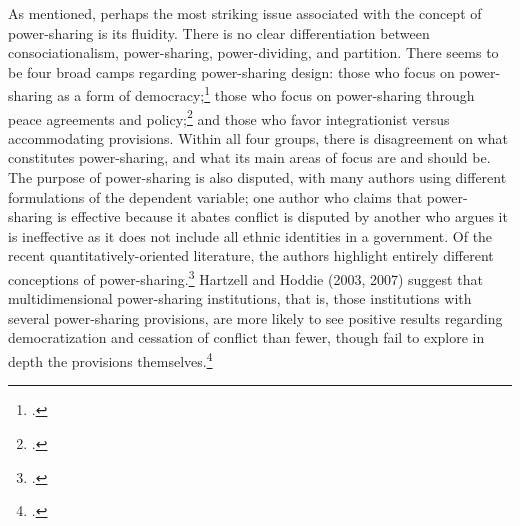 \documentclass[12pt]{article}
\begin{document}
As mentioned, perhaps the most striking issue associated with the concept of power-sharing is its fluidity. There is no clear differentiation between consociationalism, power-sharing, power-dividing, and partition. There seems to be four broad camps regarding power-sharing design: those who focus on power-sharing as a form of democracy;\footcite{barry_consociational_1975, lijphart_consociational_1974, norris_evidence_2008, steiner_research_1981} those who focus on power-sharing through peace agreements and policy;\footcite{hartzell_institutionalizing_2003, hartzell_crafting_2007, mukherjee_why_2006} and those who favor integrationist versus accommodating provisions. Within all four groups, there is disagreement on what constitutes power-sharing, and what its main areas of focus are and should be. The purpose of power-sharing is also disputed, with many authors using different formulations of the dependent variable; one author who claims that power-sharing is effective because it abates conflict is disputed by another who argues it is ineffective as it does not include all ethnic identities in a government. Of the recent quantitatively-oriented literature, the authors highlight entirely different conceptions of power-sharing.\footcite{hartzell_institutionalizing_2003, hartzell_crafting_2007, graham_safeguarding_2017, jarstad_words_2008, mattes_fostering_2009, strom_inclusion_2017, walter_committing_2002} Hartzell and Hoddie (2003, 2007) suggest that multidimensional power-sharing institutions, that is, those institutions with several power-sharing provisions, are more likely to see positive results regarding democratization and cessation of conflict than fewer, though fail to explore in depth the provisions themselves.\footcite[325-32]{hartzell_institutionalizing_2003}
\end{document}
